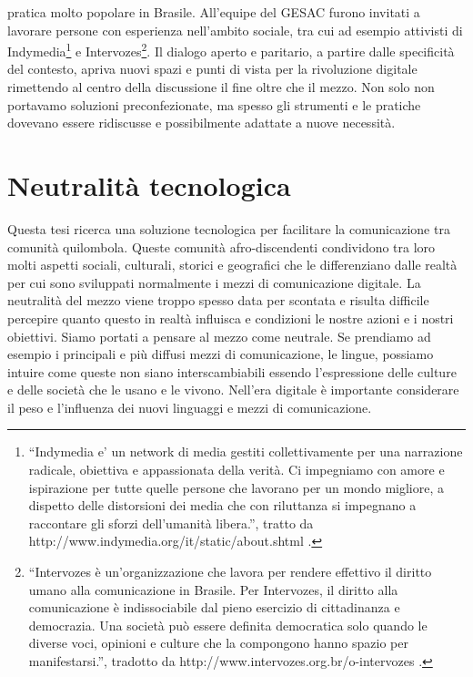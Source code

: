 pratica molto popolare in Brasile. All'equipe del GESAC furono
invitati a lavorare persone con esperienza nell'ambito sociale, tra
cui ad esempio attivisti di Indymedia\footnote{``Indymedia e' un
  network di media gestiti collettivamente per una narrazione
  radicale, obiettiva e appassionata della verità. Ci impegniamo con
  amore e ispirazione per tutte quelle persone che lavorano per un
  mondo migliore, a dispetto delle distorsioni dei media che con
  riluttanza si impegnano a raccontare gli sforzi dell'umanità
  libera.'', tratto da http://www.indymedia.org/it/static/about.shtml
  .} e Intervozes\footnote{``Intervozes è un'organizzazione che
  lavora per rendere effettivo il diritto umano alla comunicazione in
  Brasile.  Per Intervozes, il diritto alla comunicazione è
  indissociabile dal pieno esercizio di cittadinanza e democrazia. Una
  società può essere definita democratica solo quando le diverse voci,
  opinioni e culture che la compongono hanno spazio per
  manifestarsi.'', tradotto da
  http://www.intervozes.org.br/o-intervozes .}. Il dialogo aperto e
paritario, a partire dalle specificità del contesto, apriva nuovi
spazi e punti di vista per la rivoluzione digitale rimettendo al
centro della discussione il fine oltre che il mezzo. Non solo non
portavamo soluzioni preconfezionate, ma spesso gli strumenti e le
pratiche dovevano essere ridiscusse e possibilmente adattate a nuove
necessità.

\section{Neutralità tecnologica}
Questa tesi ricerca una soluzione tecnologica per facilitare la
comunicazione tra comunità quilombola. Queste comunità
afro-discendenti condividono tra loro molti aspetti sociali,
culturali, storici e geografici che le differenziano dalle realtà per
cui sono sviluppati normalmente i mezzi di comunicazione digitale.  La
neutralità del mezzo viene troppo spesso data per scontata e risulta
difficile percepire quanto questo in realtà influisca e condizioni le
nostre azioni e i nostri obiettivi. Siamo portati a pensare al mezzo
come neutrale. Se prendiamo ad esempio i principali e più diffusi
mezzi di comunicazione, le lingue, possiamo intuire come queste non
siano interscambiabili essendo l'espressione delle culture e delle
società che le usano e le vivono. Nell'era digitale è importante
considerare il peso e l'influenza dei nuovi linguaggi e mezzi di
comunicazione.

